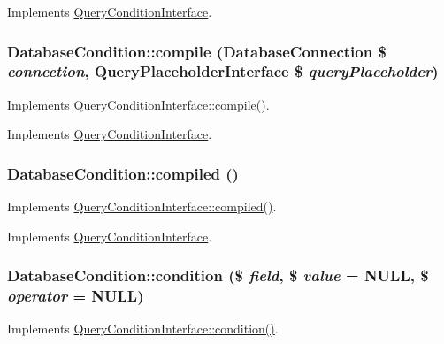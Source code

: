 Implements \hyperlink{interfaceQueryConditionInterface_ac2349e02d5332412182cf472ba1a1b1e}{QueryConditionInterface}.\hypertarget{classDatabaseCondition_a286df1af0dfaa7ab6b8b30ed4e96a830}{
\subsubsection[{compile}]{\setlength{\rightskip}{0pt plus 5cm}DatabaseCondition::compile ({\bf DatabaseConnection} \$ {\em connection}, \/  {\bf QueryPlaceholderInterface} \$ {\em queryPlaceholder})}}
\label{classDatabaseCondition_a286df1af0dfaa7ab6b8b30ed4e96a830}
Implements \hyperlink{interfaceQueryConditionInterface_ad409672ac9ac50787eec52ecdf5a60b1}{QueryConditionInterface::compile()}. 

Implements \hyperlink{interfaceQueryConditionInterface_ad409672ac9ac50787eec52ecdf5a60b1}{QueryConditionInterface}.\hypertarget{classDatabaseCondition_ac084ec53fb54ca89446acffda50b2e6a}{
\subsubsection[{compiled}]{\setlength{\rightskip}{0pt plus 5cm}DatabaseCondition::compiled ()}}
\label{classDatabaseCondition_ac084ec53fb54ca89446acffda50b2e6a}
Implements \hyperlink{interfaceQueryConditionInterface_a4aac3f4505275edecad9c22351e591cb}{QueryConditionInterface::compiled()}. 

Implements \hyperlink{interfaceQueryConditionInterface_a4aac3f4505275edecad9c22351e591cb}{QueryConditionInterface}.\hypertarget{classDatabaseCondition_a0cb79d38e9978eb08eb863f6564d0b1d}{
\subsubsection[{condition}]{\setlength{\rightskip}{0pt plus 5cm}DatabaseCondition::condition (\$ {\em field}, \/  \$ {\em value} = {\ttfamily NULL}, \/  \$ {\em operator} = {\ttfamily NULL})}}
\label{classDatabaseCondition_a0cb79d38e9978eb08eb863f6564d0b1d}
Implements \hyperlink{interfaceQueryConditionInterface_aa6d9d96fa17441b5222d1ffddd4c1799}{QueryConditionInterface::condition()}. 

